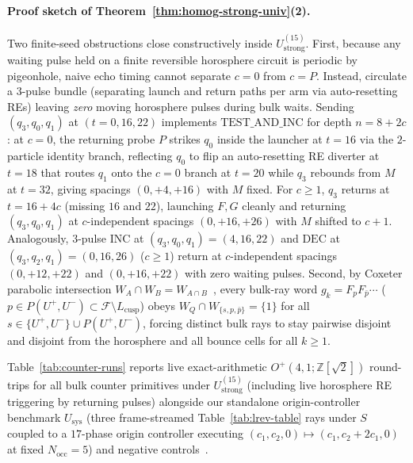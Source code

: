 \paragraph{Proof sketch of Theorem~\ref{thm:homog-strong-univ}(2).}
Two finite-seed obstructions close constructively inside $U_{\mathrm{strong}}^{(15)}$. First, because any waiting pulse held on a finite reversible horosphere circuit is periodic by pigeonhole, naive echo timing cannot separate $c = 0$ from $c = P$. Instead, circulate a $3$-pulse bundle (separating launch and return paths per arm via auto-resetting REs) leaving \emph{zero} moving horosphere pulses during bulk waits. Sending $(q_3, q_0, q_1)$ at $(t=0, 16, 22)$ implements $\mathrm{TEST\_AND\_INC}$ for depth $n = 8 + 2c$: at $c = 0$, the returning probe $P$ strikes $q_0$ inside the launcher at $t = 16$ via the $2$-particle identity branch, reflecting $q_0$ to flip an auto-resetting RE diverter at $t = 18$ that routes $q_1$ onto the $c = 0$ branch at $t = 20$ while $q_3$ rebounds from $M$ at $t = 32$, giving spacings $(0, +4, +16)$ with $M$ fixed. For $c \ge 1$, $q_3$ returns at $t = 16 + 4c$ (missing $16$ and $22$), launching $F, G$ cleanly and returning $(q_3, q_0, q_1)$ at $c$-independent spacings $(0, +16, +26)$ with $M$ shifted to $c + 1$. Analogously, $3$-pulse $\mathrm{INC}$ at $(q_3, q_0, q_1) = (4, 16, 22)$ and $\mathrm{DEC}$ at $(q_3, q_2, q_1) = (0, 16, 26)$ ($c \ge 1$) return at $c$-independent spacings $(0, +12, +22)$ and $(0, +16, +22)$ with zero waiting pulses. Second, by Coxeter parabolic intersection $W_A \cap W_B = W_{A \cap B}$~\cite{davis2008racg}, every bulk-ray word $g_k = F_p F_{\bar{p}} \cdots$ ($p \in P(U^+, U^-) \subset \mathcal{F} \setminus L_{\mathrm{cusp}}$) obeys $W_Q \cap W_{\{s, p, \bar{p}\}} = \{1\}$ for all $s \in \{U^+, U^-\} \cup P(U^+, U^-)$, forcing distinct bulk rays to stay pairwise disjoint and disjoint from the horosphere and all bounce cells for all $k \ge 1$.

Table~\ref{tab:counter-runs} reports live exact-arithmetic $O^+(4,1;\mathbb{Z}[\sqrt{2}])$ round-trips for all bulk counter primitives under $U_{\mathrm{strong}}^{(15)}$ (including live horosphere RE triggering by returning pulses) alongside our standalone origin-controller benchmark $U_{\mathrm{sys}}$ (three frame-streamed Table~\ref{tab:lrev-table} rays under $S$ coupled to a $17$-phase origin controller executing $(c_1, c_2, 0) \mapsto (c_1, c_2 + 2c_1, 0)$ at fixed $N_{\mathrm{occ}} = 5$) and negative controls~\cite{pollard2026repo}.

